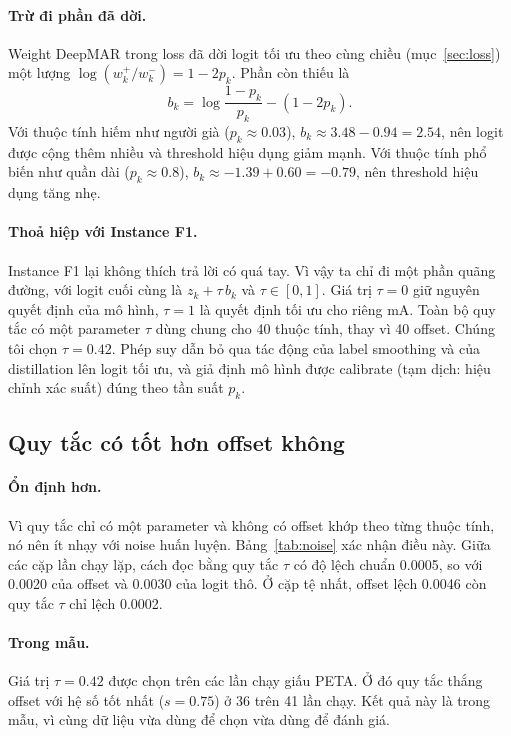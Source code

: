 \documentclass[11pt,a4paper]{article}
\begin{document}
\paragraph{Trừ đi phần đã dời.} Weight DeepMAR trong loss đã dời logit tối ưu theo cùng chiều (mục~\ref{sec:loss}) một lượng $\log(w^+_k/w^-_k)=1-2p_k$. Phần còn thiếu là
\begin{equation}
b_k = \log\frac{1-p_k}{p_k} - (1-2p_k).
\label{eq:theory}
\end{equation}
Với thuộc tính hiếm như người già ($p_k\approx0.03$), $b_k\approx 3.48-0.94=2.54$, nên logit được cộng thêm nhiều và threshold hiệu dụng giảm mạnh. Với thuộc tính phổ biến như quần dài ($p_k\approx0.8$), $b_k\approx -1.39+0.60=-0.79$, nên threshold hiệu dụng tăng nhẹ.

\paragraph{Thoả hiệp với Instance F1.} Instance F1 lại không thích trả lời có quá tay. Vì vậy ta chỉ đi một phần quãng đường, với logit cuối cùng là $z_k+\tau\,b_k$ và $\tau\in[0,1]$. Giá trị $\tau=0$ giữ nguyên quyết định của mô hình, $\tau=1$ là quyết định tối ưu cho riêng mA. Toàn bộ quy tắc có một parameter $\tau$ dùng chung cho 40 thuộc tính, thay vì 40 offset. Chúng tôi chọn $\tau=0.42$. Phép suy dẫn bỏ qua tác động của label smoothing và của distillation lên logit tối ưu, và giả định mô hình được calibrate (tạm dịch: hiệu chỉnh xác suất) đúng theo tần suất $p_k$.

\subsection{Quy tắc có tốt hơn offset không}

\paragraph{Ổn định hơn.} Vì quy tắc chỉ có một parameter và không có offset khớp theo từng thuộc tính, nó nên ít nhạy với noise huấn luyện. Bảng~\ref{tab:noise} xác nhận điều này. Giữa các cặp lần chạy lặp, cách đọc bằng quy tắc $\tau$ có độ lệch chuẩn 0.0005, so với 0.0020 của offset và 0.0030 của logit thô. Ở cặp tệ nhất, offset lệch 0.0046 còn quy tắc $\tau$ chỉ lệch 0.0002.

\paragraph{Trong mẫu.} Giá trị $\tau=0.42$ được chọn trên các lần chạy giấu PETA. Ở đó quy tắc thắng offset với hệ số tốt nhất ($s=0.75$) ở 36 trên 41 lần chạy. Kết quả này là trong mẫu, vì cùng dữ liệu vừa dùng để chọn vừa dùng để đánh giá.
\end{document}
